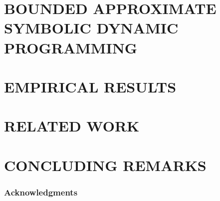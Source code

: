 \documentclass[]{article}
\begin{document}


\section{BOUNDED APPROXIMATE SYMBOLIC DYNAMIC PROGRAMMING}




\section{EMPIRICAL RESULTS}



\section{RELATED WORK}



\section{CONCLUDING REMARKS}



\subsubsection*{Acknowledgments}




\end{document}
